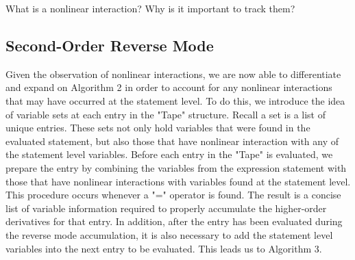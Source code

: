 \documentclass[oneside]{article}
\begin{document}
\begin{editnote}
What is a nonlinear interaction?
Why is it important to track them?
\end{editnote}

\subsection{Second-Order Reverse Mode}
Given the observation of nonlinear interactions, we are now able to differentiate and expand on Algorithm 2 in order to account for any nonlinear interactions that may have occurred at the statement level. To do this, we introduce the idea of variable sets at each entry in the "Tape" structure. Recall a set is a list of unique entries. These sets not only hold variables that were found in the evaluated statement, but also those that have nonlinear interaction with any of the statement level variables. Before each entry in the "Tape" is evaluated, we prepare the entry by combining the variables from the expression statement with those that have nonlinear interactions with variables found at the statement level. This procedure occurs whenever a "=" operator is found.  The result is a concise list of variable information required to properly accumulate the higher-order derivatives for that entry. In addition, after the entry has been evaluated during the reverse mode accumulation, it is also necessary to add the statement level variables into the next entry to be evaluated. This leads us to Algorithm 3. \\
\newpage
\end{document}
